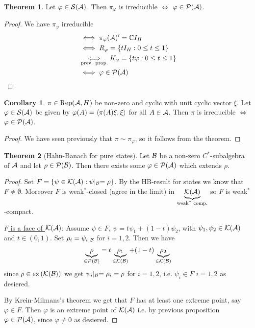 \documentclass[10pt,english,a4paper]{article}
\theoremstyle{definition}
\newtheorem*{theorem}{Theorem}
\newtheorem*{corollary}{Corollary}
\def\ex{\textnormal{ex}\,}
\def\pivp{\pi_{\vphi}}
\DeclareMathOperator{\Rep}{Rep}
\def\vphi{\varphi}
\begin{document}
\begin{theorem}
    Let $\vphi \in \Ss(\As)$. Then $\pivp$ is irreducible 
$\iff$ $\vphi \in \Ps(\As)$.
\end{theorem}
\begin{proof}
    We have $\pivp$ irreducible 
\begin{align*}
    &\iff \pivp(\As)' = \C I_H \\
    &\iff R_{\vphi}= \{ tI_H : 0\leq t\leq 1 \}\\
    &\underset{\text{prev. prop.}}{\iff} K_{\vphi}=\{t\vphi : 0 \leq t \leq 1\}\\
&\iff \vphi \in \Ps(\As)
\end{align*}
\end{proof}

\begin{corollary}
$\pi \in \Rep(\As,H)$ be non-zero and cyclic with unit cyclic vector $\xi$. 
Let $\vphi \in \Ss(\As)$ be given by $\vphi(A) = \ind{\pi(A)\xi,\xi}$ for all 
$A\in\mathcal{A}$. Then $\pi$ is irreducible $\iff$ $\vphi \in \Ps(\As)$.    
\end{corollary}
\begin{proof}
    We have seen previously that $\pi\sim \pivp$, so it follows from the theorem. 
\end{proof}

\begin{theorem}[Hahn-Banach for pure states]
    Let $\mathcal{B}$ be a non-zero $C^*$-subalgebra of $\mathcal{A}$
and let $\rho \in \mathcal{P}(\mathcal{B})$. Then there exists some $\vphi \in \Ps(\As)$
which extends $\rho$.
\end{theorem}
\begin{proof}
    Set $F = \{\psi \in \mathcal{K}(\mathcal{A}) : \psi\lvert_{\mathcal{B}} = \rho\}$. 
By the HB-result for states we know that $F\neq \emptyset$.
Moreover $F$ is weak$^*$-closed (agree in the limit) in $\underbrace{\mathcal{K}(\mathcal{A})}_{\text{weak$^*$ comp.}}$
so $F$ is weak$^*$-compact. 

\ul{$F$ is a face of $\mathcal{K}(\mathcal{A})$}:
Assume $\psi \in F$, $\psi = t \psi_1 + (1-t)\psi_2$, with $\psi_1,\psi_2\in \mathcal{K}(\mathcal{A})$
and $t\in (0,1)$. 
Set $\rho_{i} = \psi_{i}\lvert_{\mathcal{B}}$ for $i=1,2$.
Then we have 
\[ \underbrace{\rho}_{\in \mathcal{P}(\mathcal{B})} = t\underbrace{\rho_1}_{\in \mathcal{K}(\mathcal{B})} + (1-t)\underbrace{\rho_{2}}_{\in \mathcal{K}(\mathcal{B})} \]
since $\rho \in \ex(\Ks(\Bs))$ we get $\psi_{i}\lvert_{\mathcal{B}}=\rho_i = \rho$ for $i=1,2$,
i.e. $\psi_i \in F$ $i=1,2$ as desiered.

By Krein-Milmans's theorem we get that $F$ has at least one extreme point, say
$\vphi\in F$. Then $\vphi$ is an extreme point of $\mathcal{K}(\mathcal{A})$ i.e. by previous
proposition $\vphi\in \Ps(\As)$, since $\vphi\neq 0$ as desiered.
\end{proof}
\end{document}
